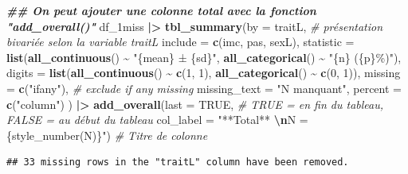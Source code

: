 \documentclass[
]{book}
\newenvironment{Shaded}{\begin{snugshade}}{\end{snugshade}}
\newcommand{\AttributeTok}[1]{\textcolor[rgb]{0.13,0.29,0.53}{#1}}
\newcommand{\CommentTok}[1]{\textcolor[rgb]{0.56,0.35,0.01}{\textit{#1}}}
\newcommand{\ConstantTok}[1]{\textcolor[rgb]{0.56,0.35,0.01}{#1}}
\newcommand{\DecValTok}[1]{\textcolor[rgb]{0.00,0.00,0.81}{#1}}
\newcommand{\DocumentationTok}[1]{\textcolor[rgb]{0.56,0.35,0.01}{\textbf{\textit{#1}}}}
\newcommand{\FunctionTok}[1]{\textcolor[rgb]{0.13,0.29,0.53}{\textbf{#1}}}
\newcommand{\NormalTok}[1]{#1}
\newcommand{\SpecialCharTok}[1]{\textcolor[rgb]{0.81,0.36,0.00}{\textbf{#1}}}
\newcommand{\StringTok}[1]{\textcolor[rgb]{0.31,0.60,0.02}{#1}}
\begin{document}
\begin{Shaded}
\begin{Highlighting}[]
\DocumentationTok{\#\# On peut ajouter une colonne total avec la fonction "add\_overall()"}
\NormalTok{df\_1miss }\SpecialCharTok{|\textgreater{}} 
  \FunctionTok{tbl\_summary}\NormalTok{(}\AttributeTok{by =}\NormalTok{ traitL, }\CommentTok{\# présentation bivariée selon la variable traitL}
              \AttributeTok{include =} \FunctionTok{c}\NormalTok{(imc, pas, sexL), }
              \AttributeTok{statistic =} \FunctionTok{list}\NormalTok{(}\FunctionTok{all\_continuous}\NormalTok{() }\SpecialCharTok{\textasciitilde{}} \StringTok{"\{mean\} ± \{sd\}"}\NormalTok{, }
                               \FunctionTok{all\_categorical}\NormalTok{() }\SpecialCharTok{\textasciitilde{}} \StringTok{"\{n\} (\{p\}\%)"}\NormalTok{),}
              \AttributeTok{digits =} \FunctionTok{list}\NormalTok{(}\FunctionTok{all\_continuous}\NormalTok{() }\SpecialCharTok{\textasciitilde{}} \FunctionTok{c}\NormalTok{(}\DecValTok{1}\NormalTok{, }\DecValTok{1}\NormalTok{), }
                            \FunctionTok{all\_categorical}\NormalTok{() }\SpecialCharTok{\textasciitilde{}} \FunctionTok{c}\NormalTok{(}\DecValTok{0}\NormalTok{, }\DecValTok{1}\NormalTok{)),}
              \AttributeTok{missing =} \FunctionTok{c}\NormalTok{(}\StringTok{"ifany"}\NormalTok{), }\CommentTok{\# exclude if any missing}
              \AttributeTok{missing\_text =} \StringTok{"N manquant"}\NormalTok{, }
              \AttributeTok{percent =} \FunctionTok{c}\NormalTok{(}\StringTok{"column"}\NormalTok{)}
\NormalTok{  ) }\SpecialCharTok{|\textgreater{}}
  \FunctionTok{add\_overall}\NormalTok{(}\AttributeTok{last =} \ConstantTok{TRUE}\NormalTok{, }\CommentTok{\# TRUE = en fin du tableau, FALSE = au début du tableau}
              \AttributeTok{col\_label =} \StringTok{"**Total**  }\SpecialCharTok{\textbackslash{}n}\StringTok{N = \{style\_number(N)\}"}\NormalTok{) }\CommentTok{\# Titre de colonne}
\end{Highlighting}
\end{Shaded}

\begin{verbatim}
## 33 missing rows in the "traitL" column have been removed.
\end{verbatim}
\end{document}

